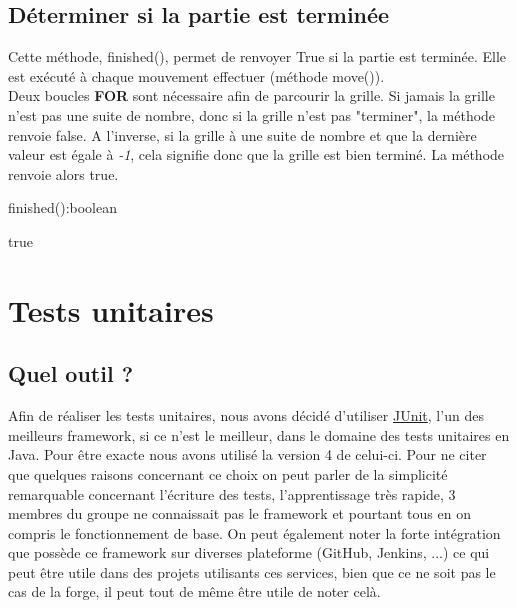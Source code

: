 		\subsection{Déterminer si la partie est terminée}

			Cette méthode, finished(), permet de renvoyer True si la partie est terminée. Elle est exécuté à chaque mouvement effectuer (méthode move()).\\
			Deux boucles \textbf{FOR} sont nécessaire afin de parcourir la grille. Si jamais la grille n'est pas une suite de nombre, donc si la grille n'est pas "terminer", la méthode renvoie false. A l'inverse, si la grille à une suite de nombre et que la dernière valeur est égale à \textit{-1}, cela signifie donc que la grille est bien terminé. La méthode renvoie alors true.\\

			\begin{algorithm}[H]
				\caption{finished():boolean}
				\Return true
			\end{algorithm}



	\section{Tests unitaires}

		\subsection{Quel outil ?}

			Afin de réaliser les tests unitaires, nous avons décidé d'utiliser \href{https://junit.org/junit4/}{JUnit}, l'un des meilleurs framework, si ce n'est le meilleur, dans le domaine des tests unitaires en Java. Pour être exacte nous avons utilisé la version 4 de celui-ci. Pour ne citer que quelques raisons concernant ce choix on peut parler de la simplicité remarquable concernant l'écriture des tests, l'apprentissage très rapide, 3 membres du groupe ne connaissait pas le framework et pourtant tous en on compris le fonctionnement de base. On peut également noter la forte intégration que possède ce framework sur diverses plateforme (GitHub, Jenkins, ...) ce qui peut être utile dans des projets utilisants ces services, bien que ce ne soit pas le cas de la forge, il peut tout de même être utile de noter celà.

